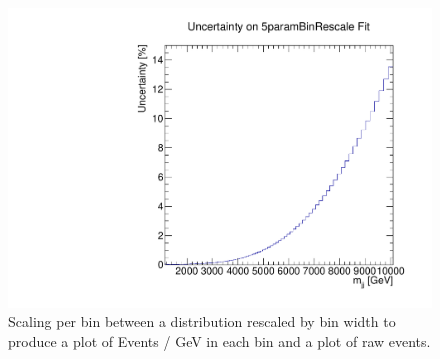 
\begin{figure}
    \centering
    \includegraphics[width=1\linewidth]{figures/app-GlobalFitStudies/5ParamGlobalFit_ystar0.8_Uncertainty.pdf}
    \caption{Scaling per bin between a distribution rescaled by bin width to produce a plot of Events / GeV in each bin and a plot of raw events.}
    \label{fig:BinningShapeAdjustment}
\end{figure}


